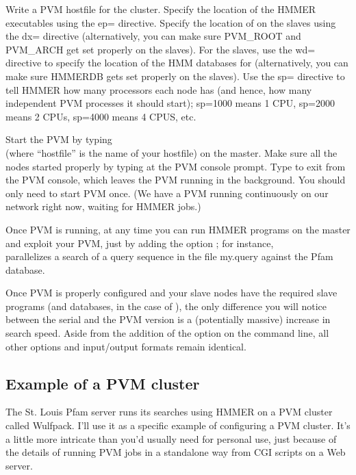 Write a PVM hostfile for the cluster. Specify the location of the
HMMER executables using the ep= directive. Specify the location of
 on the slaves using the dx= directive (alternatively, you
can make sure PVM\_ROOT and PVM\_ARCH get set properly on the
slaves). For the slaves, use the wd= directive to specify the location
of the HMM databases for  (alternatively, you can make
sure HMMERDB gets set properly on the slaves). Use the sp= directive
to tell HMMER how many processors each node has (and hence, how many
independent PVM processes it should start); sp=1000 means 1 CPU,
sp=2000 means 2 CPUs, sp=4000 means 4 CPUS, etc.

Start the PVM by typing\\
(where ``hostfile'' is the
name of your hostfile) on the master. Make sure all the nodes started
properly by typing 
at the PVM console prompt.
Type 
 to exit from the PVM console,
which leaves the PVM running in the background.
You should only need to start PVM once. (We have a
PVM running continuously on our network right now, waiting
for HMMER jobs.)

Once PVM is running, at any time you can run HMMER programs on the
master and exploit your PVM, just by adding the option ;
for instance,\\
parallelizes a search of
a query sequence in the file my.query against the Pfam database.

Once PVM is properly configured and your slave nodes have the required
slave programs (and databases, in the case of ), the
only difference you will notice between the serial and the PVM version
is a (potentially massive) increase in search speed. Aside from the
addition of the  option on the command line, all other
options and input/output formats remain identical.

\subsection{Example of a PVM cluster}

The St. Louis Pfam server runs its searches using HMMER on a PVM
cluster called Wulfpack. I'll use it as a specific example of
configuring a PVM cluster. It's a little more intricate than you'd
usually need for personal use, just because of the details of running
PVM jobs in a standalone way from CGI scripts on a Web server.

